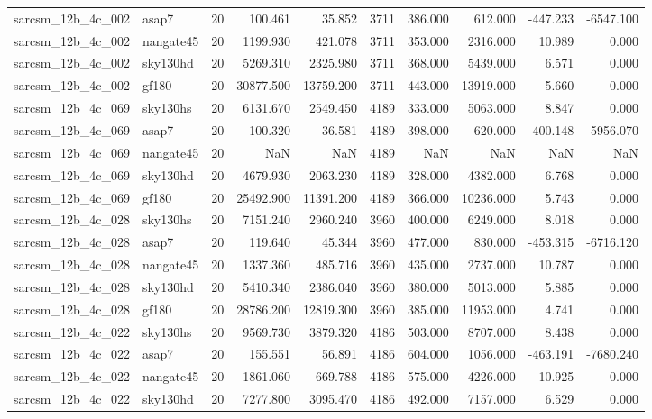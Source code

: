 \begin{tabular}{llrrrrrrrr}
sarcsm\_12b\_4c\_002 & asap7 & 20 & 100.461 & 35.852 & 3711 & 386.000 & 612.000 & -447.233 & -6547.100 \\
sarcsm\_12b\_4c\_002 & nangate45 & 20 & 1199.930 & 421.078 & 3711 & 353.000 & 2316.000 & 10.989 & 0.000 \\
sarcsm\_12b\_4c\_002 & sky130hd & 20 & 5269.310 & 2325.980 & 3711 & 368.000 & 5439.000 & 6.571 & 0.000 \\
sarcsm\_12b\_4c\_002 & gf180 & 20 & 30877.500 & 13759.200 & 3711 & 443.000 & 13919.000 & 5.660 & 0.000 \\
sarcsm\_12b\_4c\_069 & sky130hs & 20 & 6131.670 & 2549.450 & 4189 & 333.000 & 5063.000 & 8.847 & 0.000 \\
sarcsm\_12b\_4c\_069 & asap7 & 20 & 100.320 & 36.581 & 4189 & 398.000 & 620.000 & -400.148 & -5956.070 \\
sarcsm\_12b\_4c\_069 & nangate45 & 20 & NaN & NaN & 4189 & NaN & NaN & NaN & NaN \\
sarcsm\_12b\_4c\_069 & sky130hd & 20 & 4679.930 & 2063.230 & 4189 & 328.000 & 4382.000 & 6.768 & 0.000 \\
sarcsm\_12b\_4c\_069 & gf180 & 20 & 25492.900 & 11391.200 & 4189 & 366.000 & 10236.000 & 5.743 & 0.000 \\
sarcsm\_12b\_4c\_028 & sky130hs & 20 & 7151.240 & 2960.240 & 3960 & 400.000 & 6249.000 & 8.018 & 0.000 \\
sarcsm\_12b\_4c\_028 & asap7 & 20 & 119.640 & 45.344 & 3960 & 477.000 & 830.000 & -453.315 & -6716.120 \\
sarcsm\_12b\_4c\_028 & nangate45 & 20 & 1337.360 & 485.716 & 3960 & 435.000 & 2737.000 & 10.787 & 0.000 \\
sarcsm\_12b\_4c\_028 & sky130hd & 20 & 5410.340 & 2386.040 & 3960 & 380.000 & 5013.000 & 5.885 & 0.000 \\
sarcsm\_12b\_4c\_028 & gf180 & 20 & 28786.200 & 12819.300 & 3960 & 385.000 & 11953.000 & 4.741 & 0.000 \\
sarcsm\_12b\_4c\_022 & sky130hs & 20 & 9569.730 & 3879.320 & 4186 & 503.000 & 8707.000 & 8.438 & 0.000 \\
sarcsm\_12b\_4c\_022 & asap7 & 20 & 155.551 & 56.891 & 4186 & 604.000 & 1056.000 & -463.191 & -7680.240 \\
sarcsm\_12b\_4c\_022 & nangate45 & 20 & 1861.060 & 669.788 & 4186 & 575.000 & 4226.000 & 10.925 & 0.000 \\
sarcsm\_12b\_4c\_022 & sky130hd & 20 & 7277.800 & 3095.470 & 4186 & 492.000 & 7157.000 & 6.529 & 0.000 \\

\end{tabular}
